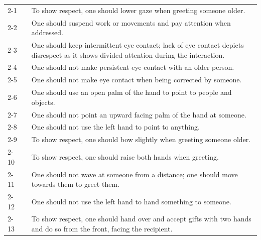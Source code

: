 \documentclass{CSSRforAfrica}
\begin{document}
\begin{table}[thb]
\begin{center}
\begin{tabularx}{\linewidth}{|l c|X|}
\hline \hline
 {\small 2-1}  & {\small} & {\small To show respect, one should lower gaze when greeting someone older.} \vspace{-10mm}\\
 {\small 2-2 }  & {\small} & {\small  One should suspend work or movements and pay attention when addressed.}\vspace{-10mm}\\
 {\small 2-3 }  & {\small} & {\small  One should keep intermittent eye contact; lack of eye contact depicts disrespect as it shows divided attention during the interaction. }\\
 {\small 2-4 }  & {\small} & {\small  One should not make persistent eye contact with an older person. }\vspace{-1mm}\\
 {\small 2-5 }  & {\small} & {\small  One should not make eye contact when being corrected by someone. }\vspace{-1mm}\\
 {\small 2-6}  & {\small} & {\small One should use an open palm of the hand to point to people and objects.}\vspace{-1mm}\\
 {\small 2-7}  & {\small} & {\small  One should not point an upward facing palm of the hand at someone.}\vspace{-1mm}\\
 {\small 2-8 }  & {\small} & {\small  One should not use the left hand to point to anything. }\vspace{-1mm}\\
 {\small 2-9 }  & {\small} & {\small  To show respect, one should bow slightly when greeting someone older.}\vspace{-1mm}\\
 {\small 2-10}  & {\small} & {\small To show respect, one should raise both hands when greeting.}\\
 {\small 2-11}  & {\small} & {\small  One should not wave at someone from a distance; one should move towards them to greet them.}\\
 {\small 2-12}  & {\small} & {\small  One should not use the left hand to hand something to someone.}\\
 {\small 2-13 }  & {\small} & {\small  To show respect, one should hand over and accept gifts with two hands and do so from the front, facing the recipient.}\\

\end{tabularx}
\end{center}
\end{table}
\end{document}
